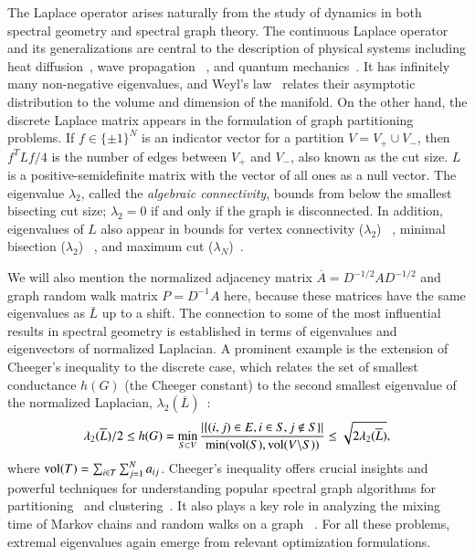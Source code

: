 The Laplace operator arises naturally from the study of dynamics in both
spectral geometry and spectral graph theory. The continuous Laplace operator
and its generalizations are central to the description of physical systems
including heat diffusion~\cite{mckean1972selberg}, wave propagation~
\cite{levy2006laplace}, and quantum mechanics~\cite{ducastelle1970moments}. It
has infinitely many non-negative eigenvalues, and Weyl's law~
\cite{weyl1911asymptotische} relates their asymptotic distribution to the volume
and dimension of the manifold. On the other hand, the discrete Laplace matrix
appears in the formulation of graph partitioning problems. If $f \in \{ \pm 1
\}^N$ is an indicator vector for a partition $V = V_+ \cup V_-$, then $f^T L
f/4$ is the number of edges between $V_+$ and $V_{-}$, also known as the cut
size. $L$ is a positive-semidefinite matrix with the vector of all ones as a
null vector. The eigenvalue $\lambda_2$, called the {\em algebraic
connectivity}, bounds from below the smallest bisecting cut size; $\lambda_2 =
0$ if and only if the graph is disconnected. In addition, eigenvalues of $L$
also appear in bounds for vertex connectivity ($\lambda_2$)~
\cite{cvetkovic2009introduction}, minimal bisection ($\lambda_2$)~
\cite{donath2003lower}, and maximum cut ($\lambda_N$)~\cite{trevisan2012max}.

 We will also mention the normalized adjacency matrix $\overline{A} =
D^{-1/2}AD^{-1/2}$ and graph random walk matrix $P = D^{-1}A$ here, because
these matrices have the same eigenvalues as $\bar{L}$ up to a shift. The
connection to some of the most influential results in spectral geometry is
established in terms of eigenvalues and eigenvectors of normalized Laplacian. A
prominent example is the extension of Cheeger's inequality to the discrete
case, which relates the set of smallest conductance $h(G)$ (the Cheeger
constant)  to the second smallest eigenvalue of the normalized Laplacian,
$\lambda_2(\overline{L})$~\cite{montenegro2006mathematical}:
\begin{equation}\label{eqn:cheeger}
  \lambda_2(\overline{L})/2\leq h(G) = \min_{S\subset V}\frac{\left\lvert\{(i,j)\in
  E, i\in S, j\notin S\}\right\rvert}{\min(\text{vol}(S), \text{vol}(V\backslash S))} \leq 
  \sqrt{2\lambda_2(\overline{L})} ,
\end{equation}
where $\operatorname{vol}(T) = \sum_{i \in T}\sum_{j=1}^{N}a_{ij}$. Cheeger's inequality
offers crucial insights and powerful techniques for understanding popular
spectral graph algorithms for partitioning~\cite{mcsherry2001spectral} and
clustering~\cite{ng2002spectral}. It also plays a key role in analyzing the
mixing time of Markov chains and random walks on a graph
~\cite{Mihail-1989-Markov,Sinclair-1989-Markov}. For all these problems,
extremal eigenvalues again emerge from relevant optimization formulations.

